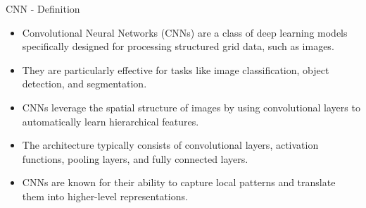 \begin{frame}[allowframebreaks]{CNN - Definition}
\begin{itemize}
    \item Convolutional Neural Networks (CNNs) are a class of deep learning models specifically designed for processing structured grid data, such as images.
    \item They are particularly effective for tasks like image classification, object detection, and segmentation.
    \item CNNs leverage the spatial structure of images by using convolutional layers to automatically learn hierarchical features.
    \item The architecture typically consists of convolutional layers, activation functions, pooling layers, and fully connected layers.
    \item CNNs are known for their ability to capture local patterns and translate them into higher-level representations.
\end{itemize}
\end{frame}